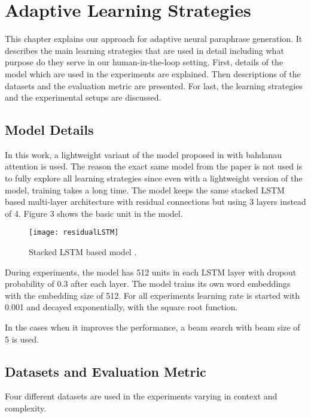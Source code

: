 \chapter{Adaptive Learning Strategies}\label{approach}

This chapter explains our approach for adaptive neural paraphrase generation. It describes the main learning strategies that are used in detail including what purpose do they serve in our human-in-the-loop setting. First, details of the model which are used in the experiments are explained. Then descriptions of the datasets and the evaluation metric are presented. For last, the learning strategies and the experimental setups are discussed.

\section{Model Details}

In this work, a lightweight variant of the model proposed in  \cite{Prakashetal} with bahdanau attention \cite{bahdanau} is used. The reason the exact same model from the paper is not used is to fully explore all learning strategies since even with a lightweight version of the model, training takes a long time. The model keeps the same stacked LSTM based multi-layer architecture with residual connections but using 3 layers instead of 4. Figure 3 shows the basic unit in the model.

\begin{figure}[t]
\texttt{[image: residualLSTM]}
\centering
\caption{Stacked LSTM based model \cite{Prakashetal}.}
\end{figure}

During experiments, the model has 512 units in each LSTM layer with dropout probability of 0.3 after each layer. The model trains its own word embeddings with the embedding size of 512. For all experiments learning rate is started with 0.001 and decayed exponentially, with the square root function.

In the cases when it improves the performance, a beam search with beam size of 5 is used.

\section{Datasets and Evaluation Metric}

Four different datasets are used in the experiments varying in context and complexity. 

